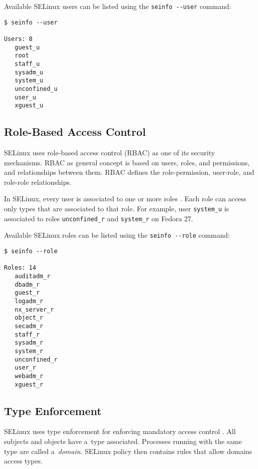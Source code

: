 Available SELinux users can be listed using the \texttt{seinfo -{}-user}
command:
\begin{lstlisting}
$ seinfo --user

Users: 8
   guest_u
   root
   staff_u
   sysadm_u
   system_u
   unconfined_u
   user_u
   xguest_u
\end{lstlisting}

\subsection{Role-Based Access Control}
\label{rbac}
SELinux uses role-based access control (RBAC) as one of its security mechanisms.
RBAC as general concept is based on users, roles, and permissions, and
relationships between them. RBAC defines the role-permission, user-role, and
role-role relationships.

In SELinux, every user is associated to one or more roles \cite[p.~24]{tsn}.
Each role can access only types that are associated to that role. For example,
user \texttt{system\_u} is associated to roles \texttt{unconfined\_r} and
\texttt{system\_r} on Fedora 27.

Available SELinux roles can be listed using the \texttt{seinfo -{}-role}
command:
\begin{lstlisting}
$ seinfo --role

Roles: 14
   auditadm_r
   dbadm_r
   guest_r
   logadm_r
   nx_server_r
   object_r
   secadm_r
   staff_r
   sysadm_r
   system_r
   unconfined_r
   user_r
   webadm_r
   xguest_r
\end{lstlisting}

\subsection{Type Enforcement}
\label{te}
SELinux uses type enforcement for enforcing mandatory access control
\cite[pp.~25--26]{tsn}. All subjects and objects have a~type associated.
Processes running with the same type are called a~\emph{domain}. SELinux
policy then contains rules that allow domains access types.

